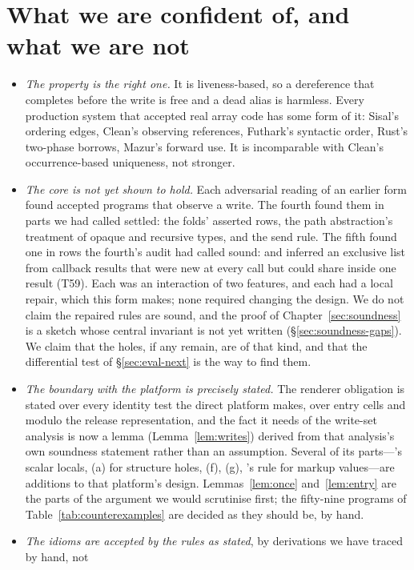 \section{What we are confident of, and what we are not}

\begin{itemize}
\item \emph{The property is the right one.} It is liveness-based, so a dereference that completes before
the write is free and a dead alias is harmless. Every production system that accepted real array code
has some form of it: Sisal's ordering edges, Clean's observing references, Futhark's syntactic order,
Rust's two-phase borrows, Mazur's forward use. It is incomparable with Clean's occurrence-based
uniqueness, not stronger.
\item \emph{The core is not yet shown to hold.} Each adversarial reading of an earlier form found accepted
programs that observe a write. The fourth found them in parts we had called settled: the folds' asserted
rows, the path abstraction's treatment of opaque and recursive types, and the send rule. The fifth found
one in rows the fourth's audit had called sound:  and  inferred an exclusive
list from callback results that were new at every call but could share inside one result (T59). Each was
an interaction of two features, and each had a local repair, which this form makes; none required changing
the design. We do not claim the repaired rules are sound, and the proof of
Chapter~\ref{sec:soundness} is a sketch whose central invariant is not yet written
(\S\ref{sec:soundness-gaps}). We claim that the holes, if any remain, are of that kind, and that the
differential test of \S\ref{sec:eval-next} is the way to find them.
\item \emph{The boundary with the platform is precisely stated.} The renderer obligation  is
stated over every identity test the direct platform makes, over entry cells and modulo the release
representation, and the fact it needs of the write-set analysis is now a lemma
(Lemma~\ref{lem:writes}) derived from that analysis's own soundness statement rather than an assumption.
Several of its parts---'s scalar locals, (a) for structure holes, (f), (g), 's rule for
markup values---are additions to that platform's design. Lemmas~\ref{lem:once} and~\ref{lem:entry} are the
parts of the argument we would scrutinise first; the fifty-nine programs of
Table~\ref{tab:counterexamples} are decided as they should be, by hand.
\item \emph{The idioms are accepted by the rules as stated}, by derivations we have traced by hand, not

\end{itemize}
